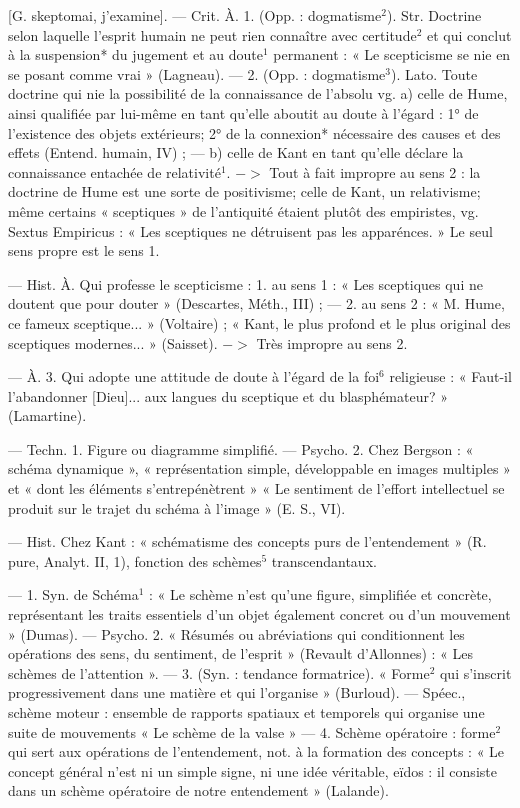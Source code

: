 \begin{itemize}[leftmargin=1cm, label=, itemsep=1pt]
 [G. skeptomai, j'examine].
— Crit. À. 1. (Opp. : dogmatisme$^2$).
Str. Doctrine selon laquelle l'esprit
humain ne peut rien connaître avec
certitude$^2$ et qui conclut à la suspension* du jugement et au doute$^1$
permanent : « Le scepticisme se nie
en se posant comme vrai » (Lagneau).
— 2. (Opp. : dogmatisme$^3$). Lato.
Toute doctrine qui nie la possibilité
de la connaissance de l'absolu
vg. a) celle de Hume, ainsi qualifiée
par lui-même en tant qu’elle aboutit
au doute à l'égard : 1° de l’existence
des objets extérieurs; 2° de la connexion* nécessaire des causes et des
effets (Entend. humain, IV) ; —
b) celle de Kant en tant qu’elle
déclare la connaissance entachée de
relativité$^1$. $->$ Tout à fait impropre
au sens 2 : la doctrine de Hume est
une sorte de positivisme; celle de
Kant, un relativisme; même certains « sceptiques » de l'antiquité
étaient plutôt des empiristes, vg.
Sextus Empiricus : « Les sceptiques
ne détruisent pas les apparénces. »
Le seul sens propre est le sens 1.

 — Hist. À. Qui professe
le scepticisme : 1. au sens 1 : « Les
sceptiques qui ne doutent que pour
douter » (Descartes, Méth., III) ; —
2. au sens 2 : « M. Hume, ce fameux
sceptique... » (Voltaire) ; « Kant, le
plus profond et le plus original des
sceptiques modernes... » (Saisset).
$->$ Très impropre au sens 2.

— À. 3. Qui adopte une attitude
de doute à l’égard de la foi$^6$ religieuse : « Faut-il l’abandonner
[Dieu]... aux langues du sceptique
et du blasphémateur? » (Lamartine).

 — Techn. 1. Figure ou diagramme simplifié. — Psycho. 2. Chez
Bergson : « schéma dynamique »,
« représentation simple, développable en images multiples » et « dont
les éléments s’entrepénètrent »
« Le sentiment de l'effort intellectuel se produit sur le trajet du
schéma à l’image » (E. S., VI).

 — Hist. Chez Kant :
« schématisme des concepts purs de
l’entendement » (R. pure, Analyt.
II, 1), fonction des schèmes$^5$ transcendantaux.

 — 1. Syn. de Schéma$^1$ : « Le
schème n’est qu’une figure, simplifiée et concrète, représentant les
traits essentiels d’un objet également concret ou d’un mouvement »
(Dumas). — Psycho. 2. « Résumés
ou abréviations qui conditionnent
les opérations des sens, du sentiment, de l'esprit » (Revault d’Allonnes) : « Les schèmes de l’attention ». — 3. (Syn. : tendance formatrice). « Forme$^2$ qui s’inscrit progressivement dans une matière et qui
l’organise » (Burloud). — Spéec.,
schème moteur : ensemble de rapports spatiaux et temporels qui organise une suite de mouvements
« Le schème de la valse » — 4.
Schème opératoire : forme$^2$ qui sert
aux opérations de l’entendement,
not. à la formation des concepts :
« Le concept général n’est ni un
simple signe, ni une idée véritable,
eïdos : il consiste dans un schème
opératoire de notre entendement »
(Lalande).


\end{itemize}
